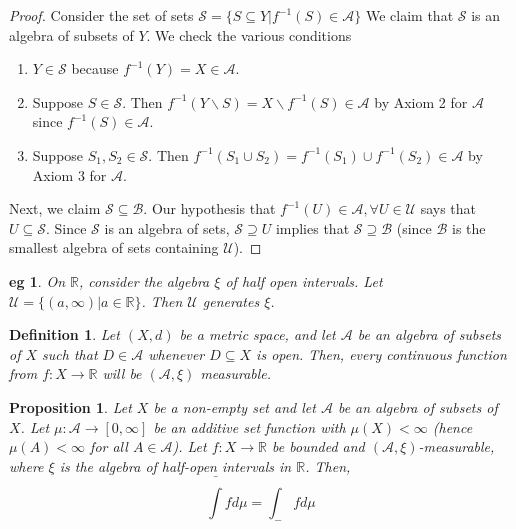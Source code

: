 \documentclass[letterpaper, 12pt]{article}
\newcommand{\fin}{\qquad \quad \hfill \framebox[1.75mm][l]{\,}}
\newcommand{\cU}{\mathcal{U}}
\newcommand{\cS}{\mathcal{S}}
\newcommand{\cB}{\mathcal{B}}
\newcommand{\bR}{\mathbb{R}}
\newcommand{\sA}{\mathcal{A}}
\theoremstyle{stdthm}
\newtheorem{prop}[thm]{Proposition}
\theoremstyle{stddef}
\newtheorem{defn}[thm]{Definition}
\newtheorem{eg}[thm]{eg} %
\theoremstyle{stdnonum}
\theoremstyle{stdqands}
\theoremstyle{stdbold}
\begin{document}
\begin{proof}
Consider the set of sets $\cS = \{S\subseteq Y| f^{-1}(S)\in \sA\}$
We claim that $\cS$ is an algebra of subsets of $Y$. We check the various conditions
\begin{enumerate}
\item $Y\in \cS$ because $f^{-1}(Y) = X \in \sA$.
\item Suppose $S\in \cS$. Then $f^{-1}(Y\backslash S) = X \backslash f^{-1}(S) \in \sA$ by Axiom 2 for $\sA$ since $f^{-1}(S) \in \sA$.
\item Suppose $S_1,S_2 \in \cS$. Then $f^{-1}(S_1 \cup S_2) = f^{-1}(S_1) \cup f^{-1}(S_2) \in \sA$ by Axiom 3 for $\sA$.
\end{enumerate}
Next, we claim $\cS \subseteq \cB$. Our hypothesis that $f^{-1}(U)\in \sA, \forall U\in \cU$ says that $U\subseteq \cS$.  Since $\cS$ is an algebra of sets, $\cS \supseteq U $ implies that $\cS \supseteq \cB$ (since $\cB$ is the smallest algebra of sets containing $\cU$). 
\end{proof}

\begin{eg}
On $\bR$, consider the algebra $\xi$ of half open intervals. Let $\cU = \{(a,\infty)|a \in \bR\}$. Then $\cU$ generates $\xi$.
\end{eg}

\begin{defn}
Let $(X,d)$ be a metric space, and let $\sA$ be an algebra of subsets of $X$ such that $D \in \sA$ whenever $D \subseteq X$ is open. Then, every continuous function from $f:X\rightarrow \bR$ will be $(\sA, \xi)$ measurable. 
\end{defn} %



\newpage
\begin{prop}
Let $X$ be a non-empty set and let $\sA$ be an algebra of subsets of $X$. Let $\mu: \sA \rightarrow [0,\infty]$ be an additive set function with $\mu(X) < \infty$ (hence $\mu(A) < \infty$ for all $A \in \sA$). Let $f: X \rightarrow \bR$ be bounded and $(\sA, \xi)$-measurable, where $\xi$ is the algebra of half-open intervals in $\bR$. Then,
\[ \bar{\int} fd\mu = \int_{-} f d\mu\]
\end{prop}
\end{document}
